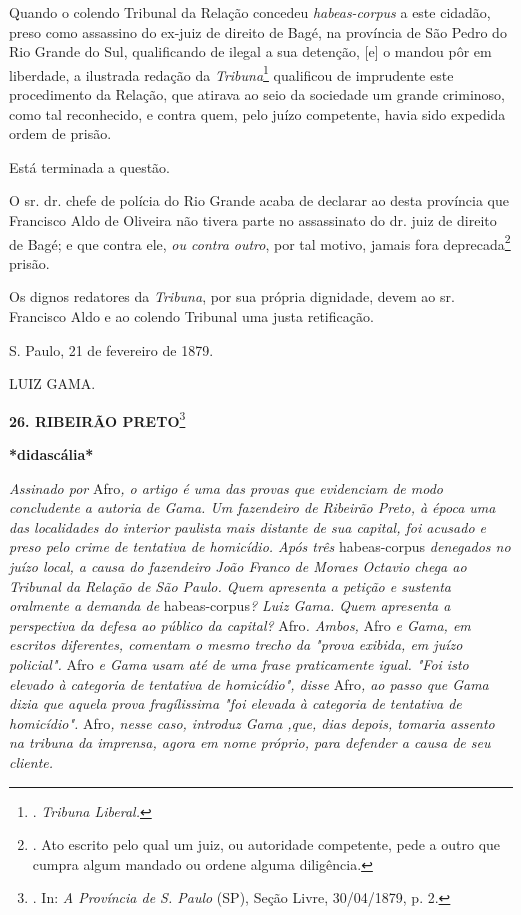 Quando o colendo Tribunal da Relação concedeu \emph{habeas-corpus} a
este cidadão, preso como assassino do ex-juiz de direito de Bagé, na
província de São Pedro do Rio Grande do Sul, qualificando de ilegal a
sua detenção, {[}e{]} o mandou pôr em liberdade, a ilustrada redação da
\emph{Tribuna}\footnote{. \emph{Tribuna Liberal.}} qualificou de
imprudente este procedimento da Relação, que atirava ao seio da
sociedade um grande criminoso, como tal reconhecido, e contra quem, pelo
juízo competente, havia sido expedida ordem de prisão.

Está terminada a questão.

O sr. dr. chefe de polícia do Rio Grande acaba de declarar ao desta
província que Francisco Aldo de Oliveira não tivera parte no assassinato
do dr. juiz de direito de Bagé; e que contra ele, \emph{ou contra
outro}, por tal motivo, jamais fora deprecada\footnote{. Ato escrito
  pelo qual um juiz, ou autoridade competente, pede a outro que cumpra
  algum mandado ou ordene alguma diligência.}
prisã\protect\hypertarget{Secao_Sem_Titulo-34}{}{}o.

Os dignos redatores da \emph{Tribuna}, por sua própria dignidade, devem
ao sr. Francisco Aldo e ao colendo Tribunal uma justa retificação.

S. Paulo, 21 de fevereiro de 1879.

LUIZ GAMA.

\textbf{26. RIBEIRÃO PRETO}\footnote{. In: \emph{A Província de S.
  Paulo} (SP), Seção Livre, 30/04/1879, p. 2.}

\textbf{*didascália*}

\emph{Assinado por} Afro\emph{, o artigo é uma das provas que evidenciam
de modo concludente a autoria de Gama. Um fazendeiro de Ribeirão Preto,
à época uma das localidades do interior paulista mais distante de sua
capital, foi acusado e preso pelo crime de tentativa de homicídio. Após
três} habeas-corpus \emph{denegados no juízo local, a causa do
fazendeiro João Franco de Moraes Octavio chega ao Tribunal da Relação de
São Paulo. Quem apresenta a petição e sustenta oralmente a demanda de}
habeas-corpus\emph{? Luiz Gama. Quem apresenta a perspectiva da defesa
ao público da capital?} Afro\emph{. Ambos,} Afro \emph{e Gama, em
escritos diferentes, comentam o mesmo trecho da "prova exibida, em juízo
policial".} Afro \emph{e Gama usam até de uma frase praticamente igual.
"Foi isto elevado à categoria de tentativa de homicídio", disse}
Afro\emph{, ao passo que Gama dizia que aquela prova fragílissima "foi
elevada à categoria de tentativa de homicídio".} Afro\emph{, nesse caso,
introduz Gama ,que, dias depois, tomaria assento na tribuna da imprensa,
agora em nome próprio, para defender a causa de seu cliente.}

